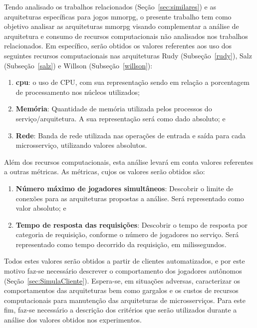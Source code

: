 Tendo analisado os trabalhos relacionados (Seção~\ref{sec:similares}) e as arquiteturas específicas para jogos \ac{mmorpg}, o presente trabalho tem como objetivo analisar as arquiteturas \ac{mmorpg} visando complementar a análise de arquitetura e consumo de recursos computacionais não analisados nos trabalhos relacionados.
%
Em específico, serão obtidos os valores referentes aos uso dos seguintes recursos computacionais nas arquiteturas Rudy (Subseção~\ref{rudy}), Salz (Subseção~\ref{salz}) e Willson (Subseção~\ref{willson}):

\begin{enumerate}
  \item \textbf{\ac{cpu}}: o uso de CPU, com sua representação sendo em relação a porcentagem de processamento nos núcleos utilizados;
  \item \textbf{Memória}: Quantidade de memória utilizada pelos processos do serviço/arquitetura. A sua representação será como dado absoluto; e
  \item \textbf{Rede}: Banda de rede utilizada nas operações de entrada e saída para cada microsserviço, utilizando valores absolutos.
\end{enumerate}

Além dos recursos computacionais, esta análise levará em conta valores referentes a outras métricas.
%
As métricas, cujos os valores serão obtidos são:

\begin{enumerate}
  \item \textbf{Número máximo de jogadores simultâneos}: Descobrir o limite de conexões para as arquiteturas propostas a análise. Será representado como valor absoluto; e
  \item \textbf{Tempo de resposta das requisições}: Descobrir o tempo de resposta por categoria de requisição, conforme o número de jogadores no serviço. Será representado como tempo decorrido da requisição, em milissegundos.
\end{enumerate}

Todos estes valores serão obtidos a partir de clientes automatizados, e por este motivo faz-se necessário descrever o comportamento dos jogadores autônomos (Seção~\ref{sec:SimulaCliente}).
%
Espera-se, em situações adversas, caracterizar os comportamentos das arquiteturas bem como gargalos e os custos de recursos computacionais para manutenção das arquiteturas de microsserviços.
%
Para este fim, faz-se necessário a descrição dos critérios que serão utilizados durante a análise dos valores obtidos nos experimentos.

